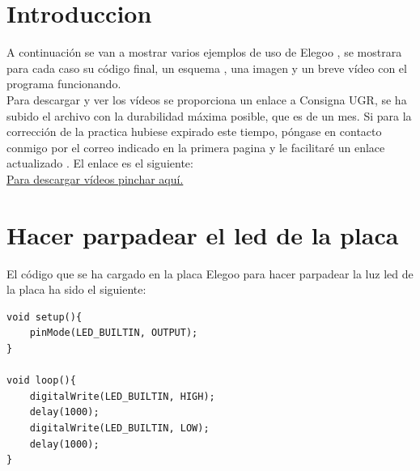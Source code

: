 	\tableofcontents %
	
	\listoffigures %
	
	\listoftables %
	
	\newpage
	
	\section[Introduccion]{Introduccion}
	
	A continuación se van a mostrar varios ejemplos de uso de Elegoo , se mostrara para cada caso su código final,
	un esquema , una imagen y un breve vídeo con el programa funcionando. \\
	
	Para descargar y ver los vídeos se proporciona un enlace a Consigna UGR, se ha subido el archivo con la durabilidad máxima
	posible, que es de un mes. Si para la corrección de la practica hubiese expirado este tiempo, póngase en contacto conmigo por el correo indicado 
	en la primera pagina y le facilitaré un enlace actualizado . El enlace es el siguiente: \\
	
	\href{https://consigna.ugr.es/f/97a9Z8BMzWkM7KLa/videos.rar}{Para descargar vídeos pinchar aquí.}
	
	\section[Hacer parpadear el led de la placa]{Hacer parpadear el led de la placa}
	
	El código que se ha cargado en la placa Elegoo para hacer parpadear la luz led de la placa ha sido el siguiente: 
	
	\lstset{language=C}
	\begin{lstlisting}[frame=single]
void setup(){
	pinMode(LED_BUILTIN, OUTPUT);
}

void loop(){
	digitalWrite(LED_BUILTIN, HIGH);
	delay(1000);
	digitalWrite(LED_BUILTIN, LOW);
	delay(1000);
}
	\end{lstlisting}
	
